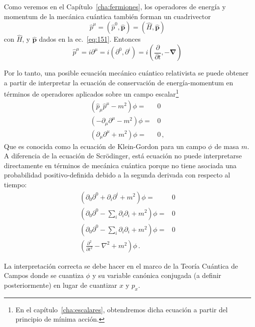 \begin{frame}
Como veremos en el Capítulo~\ref{cha:fermiones}, los operadores de energía y momentum de la mecánica cuántica también forman un cuadrivector
\begin{equation}
  \hat p^\mu=({\hat p}^0,\hat{\mathbf{p}})=(\widehat H,\hat{\mathbf{p}})
\end{equation}
con $\widehat H$, y $\hat{\mathbf{p}}$ dados en la ec.~\eqref{eq:151}. Entonces
\begin{equation}
  \label{eq:cv_hatpmu}
  \hat{p}^\mu=i\partial^\mu=i(\partial^0,\partial^i)=i(\frac{\partial}{\partial t},-\boldsymbol{\nabla})
\end{equation}

Por lo tanto, una posible ecuación mecánico cuántico relativista se puede obtener a partir de interpretar la ecuación de conservación de energía-momentum en términos de operadores aplicados sobre un campo escalar\footnote{En el capítulo~\ref{cha:escalares}, obtendremos dicha ecuación a partir del principio de mínima acción.}
\begin{align}
  \label{eq:KG}
\left(\hat{p}_\mu  \hat{p}^\mu -m^2  \right)\phi=&0 \nonumber\\
  \left(-\partial_{\mu}\partial^{\mu} -m^2  \right)\phi=&0 \nonumber\\
  \left(\partial_{\mu}\partial^{\mu} +m^2  \right)\phi=&0 \,,
\end{align}
Que es conocida como la ecuación de Klein-Gordon para un campo $\phi$ de masa $m$. A diferencia de la ecuación de Scrödinger, está ecuación no puede interpretarse directamente en términos de mecánica cuántica porque no tiene asociada una probabilidad positivo-definida debido a la segunda derivada con respecto al tiempo:
\begin{align}
  \left(\partial_0\partial^0+\partial_i\partial^i +m^2  \right)\phi=&0 \nonumber\\
  \left(\partial_0\partial^0-\sum_i\partial_i\partial_i +m^2  \right)\phi=&0 \nonumber\\
  \left(\partial_0\partial^0-\sum_i\partial_i\partial_i +m^2  \right)\phi=&0 \nonumber\\
\left(   \frac{\partial^2}{\partial t^2}-\nabla^2+m^2  \right)\phi\,.
\end{align}

La interpretación correcta se debe hacer en el marco de la Teoría Cuántica de Campos donde se cuantiza $\phi$ y su variable canónica conjugada (a definir posteriormente) en lugar de cuantizar $x$ y $p_x$.
\end{frame}



